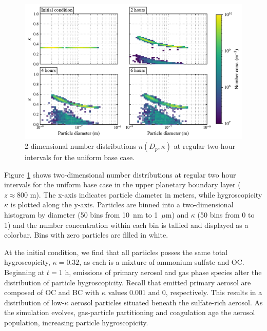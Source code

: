 \begin{figure}[!t]
  \centering
    \includegraphics[width=\textwidth]{figures/chapter5/2d-kappa-dist-4-panel-uniform-basecase-z40.pdf}
    \caption{2-dimensional number distributions $n(D_p, \kappa)$ at regular two-hour intervals for the uniform base case.}
    \label{fig:2d-kappa-dist-ub}
\end{figure}

Figure \ref{fig:2d-kappa-dist-ub} shows two-dimensional number distributions at regular two hour intervals for the uniform base case in the upper planetary boundary layer ($z\approx800$ m). The x-axis indicates particle diameter in meters, while hygroscopicity $\kappa$ is plotted along the y-axis. Particles are binned into a two-dimensional histogram by diameter (50 bins from 10~nm to 1~$\mu$m) and $\kappa$ (50 bins from 0 to 1) and the number concentration within each bin is tallied and displayed as a colorbar. Bins with zero particles are filled in white.

At the initial condition, we find that all particles posses the same total hygroscopicity, $\kappa=0.32$, as each is a mixture of ammonium sulfate and OC. Beginning at $t=1$ h, emissions of primary aerosol and gas phase species alter the distribution of particle hygroscopicity. Recall that emitted primary aerosol are composed of OC and BC with $\kappa$ values 0.001 and 0, respectively. This results in a distribution of low-$\kappa$ aerosol particles situated beneath the sulfate-rich aerosol. As the simulation evolves, gas-particle partitioning and coagulation age the aerosol population, increasing particle hygroscopicity.

